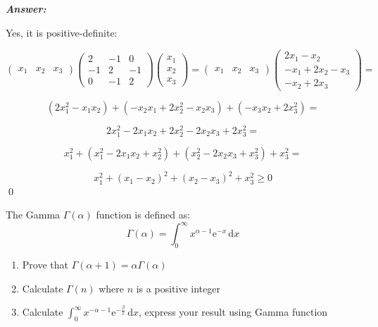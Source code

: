 \documentclass[12pt]{article}
\newenvironment{question}[2][Question]{\begin{trivlist}
\item[\hskip \labelsep {\bfseries #1}\hskip \labelsep {\bfseries #2.}]}{\end{trivlist}}
\begin{document}
\textbf{\emph{Answer:} }

Yes, it is positive-definite:


\begin{equation*}
\begin{pmatrix}
x_1 & x_2 & x_3
\end{pmatrix} 
\begin{pmatrix}
  2 & -1 & 0\\
  -1 & 2 & -1\\
  0 & -1 & 2
\end{pmatrix} 
\begin{pmatrix}
x_1 \\ 
x_2 \\
 x_3
\end{pmatrix} 
=  
\begin{pmatrix}
x_1 & x_2 & x_3
\end{pmatrix} 
\begin{pmatrix}
2 x_1 - x_2\\ 
-x_1 + 2 x_2 - x_3\\
 -x_2 + 2 x_3
\end{pmatrix}  = 
\end{equation*}

\begin{equation*}
(2 x_1^2 - x_1 x_2) + (- x_2 x_1 +2 x_2^2 - x_2 x_3) + (-x_3 x_2 + 2 x_3^2) = 
\end{equation*}

\begin{equation*}
2 x_1^2 - 2 x_1 x_2 + 2 x_2^2 - 2 x_2 x_3 + 2 x_3^2 = 
\end{equation*}

\begin{equation*}
x_1^2 + (x_1^2 - 2 x_1 x_2 + x_2^2) + (x_2^2 - 2 x_2 x_3 + x_3^2) + x_3^2= 
\end{equation*}

\begin{equation*}
x_1^2 + (x_1 - x_2)^2 + (x_2 - x_3)^2 + x_3^2\geq 0
\end{equation*}
\qed
\bigskip
\bigskip
\begin{question}{1. 5} 
The Gamma $\Gamma(\alpha)$ function is defined as:
\begin{equation*}
\Gamma(\alpha) = \int_0^\infty x^{\alpha - 1}\mathrm{e}^{-x}\,\mathrm{d}x
\end{equation*}
\begin{enumerate}
  \item Prove that $\Gamma(\alpha + 1) = \alpha\Gamma(\alpha)$
  \item Calculate $\Gamma(n)$ where $n$ is a positive integer
  \item Calculate $\int_0^\infty x^{-\alpha - 1}\mathrm{e}^{-\frac{\beta}{x}}\,\mathrm{d}x$, express your result using Gamma function
\end{enumerate}
\end{question}
\end{document}
